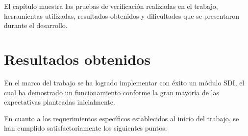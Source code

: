 El capítulo muestra las pruebas de verificación realizadas en el trabajo,
herramientas utilizadas, resultados obtenidos y dificultades que se presentaron
durante el desarrollo.


\section{Resultados obtenidos}

  En el marco del trabajo se ha logrado implementar con éxito un módulo SDI,
  el cual ha demostrado un funcionamiento conforme la gran mayoría de
  las expectativas planteadas inicialmente.

  En cuanto a los requerimientos específicos establecidos al inicio del trabajo,
  se han cumplido satisfactoriamente los siguientes puntos:

